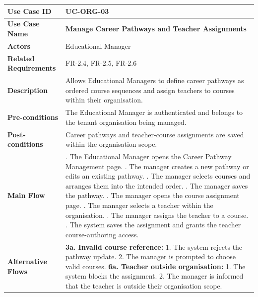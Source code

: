 \begin{longtable}{|>{\raggedright\arraybackslash}p{}|>{\raggedright\arraybackslash}p{}|}
\textbf{Use Case ID} & \textbf{UC-ORG-03} \\ \hline
\textbf{Use Case Name} & \textbf{Manage Career Pathways and Teacher Assignments} \\ \hline
\textbf{Actors} & Educational Manager \\ \hline
\textbf{Related Requirements} & FR-2.4, FR-2.5, FR-2.6 \\ \hline
\textbf{Description} & Allows Educational Managers to define career pathways as ordered course sequences and assign teachers to courses within their organisation. \\ \hline
\textbf{Pre-conditions} & The Educational Manager is authenticated and belongs to the tenant organisation being managed. \\ \hline
\textbf{Post-conditions} & Career pathways and teacher-course assignments are saved within the organisation scope. \\ \hline
\textbf{Main Flow} &
1. The Educational Manager opens the Career Pathway Management page. \newline
2. The manager creates a new pathway or edits an existing pathway. \newline
3. The manager selects courses and arranges them into the intended order. \newline
4. The manager saves the pathway. \newline
5. The manager opens the course assignment page. \newline
6. The manager selects a teacher within the organisation. \newline
7. The manager assigns the teacher to a course. \newline
8. The system saves the assignment and grants the teacher course-authoring access. \\ \hline
\textbf{Alternative Flows} &
\textbf{3a. Invalid course reference:} \newline
\hspace*{1em}1. The system rejects the pathway update. \newline
\hspace*{1em}2. The manager is prompted to choose valid courses. \newline
\textbf{6a. Teacher outside organisation:} \newline
\hspace*{1em}1. The system blocks the assignment. \newline
\hspace*{1em}2. The manager is informed that the teacher is outside their organisation scope. \\
\end{longtable}



